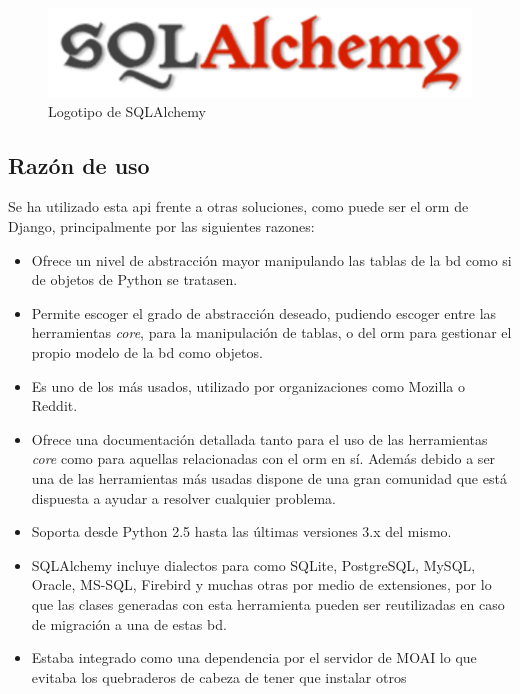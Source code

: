 \begin{figure}[!htbp]
	\centering
	\includegraphics[scale=0.5]{fig/sqla_logo}
	\caption{Logotipo de SQLAlchemy}
\end{figure}

\subsection{Razón de uso}

Se ha utilizado esta \acrshort{api} frente a otras soluciones, como puede ser el \acrshort{orm} de Django, principalmente por las siguientes razones:

\begin{itemize}
	\item Ofrece un nivel de abstracción mayor manipulando las tablas de la \acrshort{bd} como si de objetos de Python se tratasen.
	\item Permite escoger el grado de abstracción deseado, pudiendo escoger entre las herramientas \textit{core}, para la manipulación de tablas, o del \acrshort{orm} para gestionar el propio modelo de la \acrshort{bd} como objetos.
	\item Es uno de los  más usados, utilizado por organizaciones como Mozilla\cite{Mozilla} o Reddit\cite{Reddit}.
	\item Ofrece una documentación detallada tanto para el uso de las herramientas \textit{core} como para aquellas relacionadas con el \acrshort{orm} en sí. Además debido a ser una de las herramientas más usadas dispone de una gran comunidad que está dispuesta a ayudar a resolver cualquier problema.
	\item Soporta desde Python 2.5 hasta las últimas versiones 3.x del mismo.
	\item SQLAlchemy incluye dialectos para  como SQLite, PostgreSQL, MySQL, Oracle\cite{Oracle}, MS-SQL\cite{MSSQL}, Firebird\cite{Firebird} y muchas otras por medio de extensiones, por lo que las clases generadas con esta herramienta pueden ser reutilizadas en caso de migración a una de estas \acrshort{bd}.
	\item Estaba integrado como una dependencia por el servidor de MOAI lo que evitaba los quebraderos de cabeza de tener que instalar otros 
\end{itemize}

